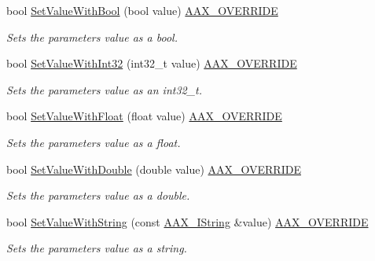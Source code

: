 \begin{Indent}
\begin{DoxyCompactItemize}
bool \mbox{\hyperlink{a01537_a2089ea0d243087c562ce8b1bd89a495a}{Set\+Value\+With\+Bool}} (bool value) \mbox{\hyperlink{a00392_ac2f24a5172689ae684344abdcce55463}{A\+A\+X\+\_\+\+O\+V\+E\+R\+R\+I\+DE}}
\begin{DoxyCompactList}\small\item\em Sets the parameter\textquotesingle{}s value as a bool. \end{DoxyCompactList}\item 
bool \mbox{\hyperlink{a01537_aaf45f020a267f894429b4a75ddbe9c6c}{Set\+Value\+With\+Int32}} (int32\+\_\+t value) \mbox{\hyperlink{a00392_ac2f24a5172689ae684344abdcce55463}{A\+A\+X\+\_\+\+O\+V\+E\+R\+R\+I\+DE}}
\begin{DoxyCompactList}\small\item\em Sets the parameter\textquotesingle{}s value as an int32\+\_\+t. \end{DoxyCompactList}\item 
bool \mbox{\hyperlink{a01537_ab3f589671d20c826859b4398e96ee9bb}{Set\+Value\+With\+Float}} (float value) \mbox{\hyperlink{a00392_ac2f24a5172689ae684344abdcce55463}{A\+A\+X\+\_\+\+O\+V\+E\+R\+R\+I\+DE}}
\begin{DoxyCompactList}\small\item\em Sets the parameter\textquotesingle{}s value as a float. \end{DoxyCompactList}\item 
bool \mbox{\hyperlink{a01537_a7551c4071f91cb48103b5a8dda8f73eb}{Set\+Value\+With\+Double}} (double value) \mbox{\hyperlink{a00392_ac2f24a5172689ae684344abdcce55463}{A\+A\+X\+\_\+\+O\+V\+E\+R\+R\+I\+DE}}
\begin{DoxyCompactList}\small\item\em Sets the parameter\textquotesingle{}s value as a double. \end{DoxyCompactList}\item 
bool \mbox{\hyperlink{a01537_a0304e07f471e1a9dd804bbba7940281e}{Set\+Value\+With\+String}} (const \mbox{\hyperlink{a01873}{A\+A\+X\+\_\+\+I\+String}} \&value) \mbox{\hyperlink{a00392_ac2f24a5172689ae684344abdcce55463}{A\+A\+X\+\_\+\+O\+V\+E\+R\+R\+I\+DE}}
\begin{DoxyCompactList}\small\item\em Sets the parameter\textquotesingle{}s value as a string. \end{DoxyCompactList}\end{DoxyCompactItemize}
\end{Indent}
